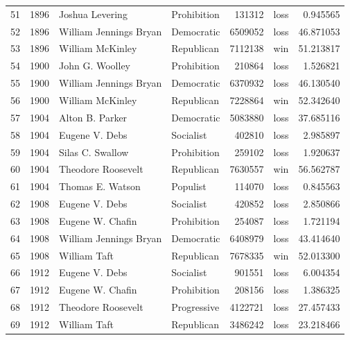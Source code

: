 \documentclass[
  letterpaper,
  DIV=11,
  numbers=noendperiod]{scrreprt}
\begin{document}
\begin{tabular}{lrllrlr}
51  &  1896 &         Joshua Levering &            Prohibition &        131312 &   loss &   0.945565 \\
52  &  1896 &  William Jennings Bryan &             Democratic &       6509052 &   loss &  46.871053 \\
53  &  1896 &        William McKinley &             Republican &       7112138 &    win &  51.213817 \\
54  &  1900 &         John G. Woolley &            Prohibition &        210864 &   loss &   1.526821 \\
55  &  1900 &  William Jennings Bryan &             Democratic &       6370932 &   loss &  46.130540 \\
56  &  1900 &        William McKinley &             Republican &       7228864 &    win &  52.342640 \\
57  &  1904 &         Alton B. Parker &             Democratic &       5083880 &   loss &  37.685116 \\
58  &  1904 &          Eugene V. Debs &              Socialist &        402810 &   loss &   2.985897 \\
59  &  1904 &        Silas C. Swallow &            Prohibition &        259102 &   loss &   1.920637 \\
60  &  1904 &      Theodore Roosevelt &             Republican &       7630557 &    win &  56.562787 \\
61  &  1904 &        Thomas E. Watson &               Populist &        114070 &   loss &   0.845563 \\
62  &  1908 &          Eugene V. Debs &              Socialist &        420852 &   loss &   2.850866 \\
63  &  1908 &        Eugene W. Chafin &            Prohibition &        254087 &   loss &   1.721194 \\
64  &  1908 &  William Jennings Bryan &             Democratic &       6408979 &   loss &  43.414640 \\
65  &  1908 &            William Taft &             Republican &       7678335 &    win &  52.013300 \\
66  &  1912 &          Eugene V. Debs &              Socialist &        901551 &   loss &   6.004354 \\
67  &  1912 &        Eugene W. Chafin &            Prohibition &        208156 &   loss &   1.386325 \\
68  &  1912 &      Theodore Roosevelt &            Progressive &       4122721 &   loss &  27.457433 \\
69  &  1912 &            William Taft &             Republican &       3486242 &   loss &  23.218466 \\

\end{tabular}
\end{document}
